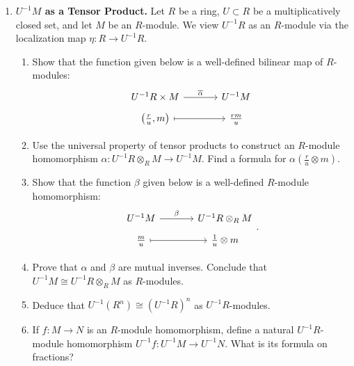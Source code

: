 \documentclass[12pt,reqno]{amsart}
\begin{document}
\begin{enumerate}[leftmargin=*,resume]
\item \textbf{$U^{-1}M$ as a Tensor Product.} Let $R$ be a ring, $U\subset R$ be a multiplicatively closed set, and let $M$ be an $R$-module. We view $U^{-1}R$ as an $R$-module via the localization map $\eta:R\to U^{-1}R$.
\begin{enumerate}
	\item Show that the function given below is a well-defined bilinear map of $R$-modules:
	\[
	\begin{tikzcd}[row sep = .5em, column sep = 3.5em]
	U^{-1}R\times M\arrow[r, "\overline{\alpha}"] & U^{-1}M\\
	 \left(\frac{r}{u},m\right)\arrow[r, mapsto] & \frac{rm}{u}
	 \end{tikzcd}
	\]
	\item Use the universal property of tensor products to construct an $R$-module homomorphism $\alpha:U^{-1}R\otimes_R M\to U^{-1}M$. Find a formula for $\alpha\left(\frac{r}{u}\otimes m\right)$.
	\item Show that the function $\beta$ given below is a well-defined $R$-module homomorphism:
	\[
	\begin{tikzcd}[row sep = .5em, column sep = 3.5em]
	U^{-1}M\arrow[r, "\beta"] & U^{-1}R\otimes_R M \\
	 \frac{m}{u}\arrow[r, mapsto] & \frac{1}{u}\otimes m
	 \end{tikzcd}.
	\]
	\item Prove that $\alpha$ and $\beta$ are mutual inverses. Conclude that $U^{-1}M\cong U^{-1}R\otimes_R M$ as $R$-modules. 
	\item Deduce that $U^{-1}(R^n)\cong (U^{-1}R)^n$ as $U^{-1}R$-modules.
	\item If $f:M\to N$ is an $R$-module homomorphism, define a natural $U^{-1}R$-module homomorphism $U^{-1}f:U^{-1}M\to U^{-1}N$. What is its formula on fractions?
\end{enumerate}

\end{enumerate}
\end{document}
